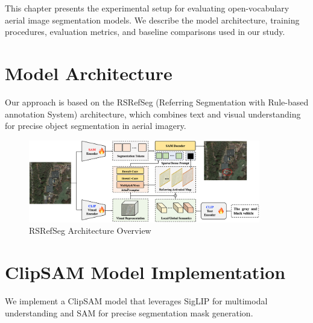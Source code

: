 \cleardoublepage
\label{chap:evaluation}

This chapter presents the experimental setup for evaluating open-vocabulary aerial image segmentation models. We describe the model architecture, training procedures, evaluation metrics, and baseline comparisons used in our study.

\section{Model Architecture}

Our approach is based on the RSRefSeg (Referring Segmentation with Rule-based annotation System) architecture, which combines text and visual understanding for precise object segmentation in aerial imagery.

\begin{figure}[H]
\centering
\includegraphics[width=0.9\textwidth]{./Images/RSRefSeg.png}
\caption{RSRefSeg Architecture Overview}
\label{fig:rsrefseg_architecture}
\end{figure}

\section{ClipSAM Model Implementation}

We implement a ClipSAM model that leverages SigLIP for multimodal understanding and SAM for precise segmentation mask generation.

